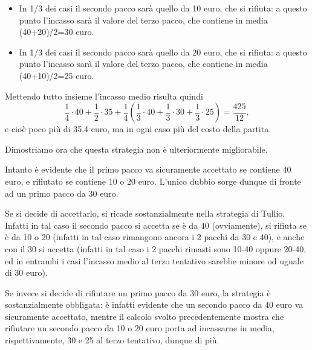 {\begin{itemize}
\begin{itemize}
		\item  In 1/3 dei casi il secondo pacco sarà quello da 10 euro, che si rifiuta: a questo punto l'incasso sarà il valore del terzo pacco, che contiene in media (40+20)/2=30 euro.
	
		\item  In 1/3 dei casi il secondo pacco sarà quello da 20 euro, che si rifiuta: a questo punto l'incasso sarà il valore del terzo pacco, che contiene in media (40+10)/2=25 euro.
	\end{itemize}
\end{itemize}

Mettendo tutto insieme l'incasso medio risulta quindi
$$\frac{1}{4}\cdot 40+\frac{1}{2}\cdot 35+\frac{1}{4}\left(
\frac{1}{3}\cdot 40+\frac{1}{3}\cdot 30+\frac{1}{3}\cdot 25\right)=
\frac{425}{12},$$
e cioè poco più di 35.4 euro, ma in ogni caso più del costo della partita.

Dimostriamo ora che questa strategia non è ulteriormente migliorabile.

Intanto è evidente che il primo pacco va sicuramente accettato se contiene 40 euro, e rifiutato se contiene 10 o 20 euro. L'unico dubbio sorge dunque di fronte ad un primo pacco da 30 euro.

Se si decide di accettarlo, si ricade sostanzialmente nella strategia di Tullio. Infatti in tal caso il secondo pacco si accetta se è da 40 (ovviamente), si rifiuta se è da 10 o 20 (infatti in tal caso rimangono ancora i 2 pacchi da 30 e 40), e anche con il 30 si accetta (infatti in tal caso i 2 pacchi rimasti sono 10-40 oppure 20-40, ed in entrambi i casi l'incasso medio al terzo tentativo sarebbe minore od uguale di 30 euro).

Se invece si decide di rifiutare un primo pacco da 30 euro, la strategia è sostanzialmente obbligata: è infatti evidente che un secondo pacco da 40 euro va sicuramente accettato, mentre il calcolo svolto precedentemente mostra che rifiutare un secondo pacco da 10 o 20 euro porta ad incassarne in media, rispettivamente, 30 e 25 al terzo tentativo, dunque di più.

}

\renewcommand{\SoluzioniAlternative}{\TitoloSoluzioneAlternativaA 
}

\renewcommand{\Osservazioni}{
}

\renewcommand{\Commenti}{
}